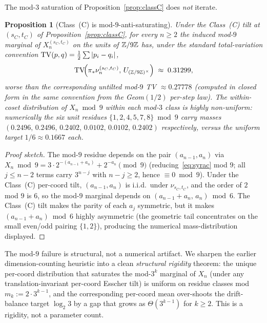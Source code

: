\documentclass[11pt]{amsart}
\newtheorem{proposition}[theorem]{Proposition}
\theoremstyle{definition}
\theoremstyle{remark}
\begin{document}
The mod-$3$ saturation of Proposition~\ref{prop:classC} does \emph{not} iterate.

\begin{proposition}[Class~(C) is mod-$9$-anti-saturating]\label{prop:mod9}
Under the Class~(C) tilt at $(s_C,t_C)$ of Proposition~\ref{prop:classC}, for every $n\ge2$ the
induced mod-$9$ marginal of $X_n^{(s_C,t_C)}$ on the units of $\mathbb{Z}/9\mathbb{Z}$ has, under the standard
total-variation convention $\mathrm{TV}(p,q)=\tfrac12\sum|p_i-q_i|$,
\[
  \mathrm{TV}\!\Big(\pi_*\nu_n^{(s_C,t_C)},\,U_{(\mathbb{Z}/9\mathbb{Z})^\times}\Big)\;\approx\;0.31299,
\]
\emph{worse} than the corresponding untilted mod-$9$ TV $\approx 0.27778$ (computed in closed form
in the same convention from the Geom$(1/2)$ per-step law). The within-coset distribution of
$X_n\bmod 9$ within each mod-$3$ class is highly non-uniform: numerically the six unit residues
$\{1,2,4,5,7,8\}\bmod 9$ carry masses
$(0.2496,\,0.2496,\,0.2402,\,0.0102,\,0.0102,\,0.2402)$ respectively,
versus the uniform target $1/6\approx 0.1667$ each.
\end{proposition}

\begin{proof}[Proof sketch]
The mod-$9$ residue depends on the pair $(a_{n-1},a_n)$ via $X_n\bmod 9=3\cdot 2^{-(a_{n-1}+a_n)}+
2^{-a_n}\pmod 9$ (reducing~\eqref{eq:syrac} mod $9$; all $j\le n-2$ terms carry $3^{n-j}$ with
$n-j\ge 2$, hence $\equiv 0\bmod 9$). Under the Class~(C) per-coord tilt, $(a_{n-1},a_n)$ is i.i.d.\
under $\nu_{s_C,t_C}$, and the order of $2$ mod $9$ is $6$, so the mod-$9$ marginal depends on
$(a_{n-1}+a_n,\,a_n)\bmod 6$. The Class~(C) tilt makes the parity of each $a_j$ symmetric, but it makes
$(a_{n-1}+a_n)\bmod 6$ highly asymmetric (the geometric tail concentrates on the small even/odd pairing
$\{1,2\}$), producing the numerical mass-distribution displayed.
\end{proof}

The mod-$9$ failure is structural, not a numerical artifact. We sharpen the earlier
dimension-counting heuristic into a clean \emph{structural rigidity} theorem: the unique per-coord
distribution that saturates the mod-$3^k$ marginal of $X_n$ (under any translation-invariant per-coord
Esscher tilt) is uniform on residue classes mod $m_k:=2\cdot 3^{k-1}$, and the corresponding per-coord
mean over-shoots the drift-balance target $\log_2 3$ by a gap that grows as $\Theta(3^{k-1})$ for
$k\ge2$. This is a rigidity, not a parameter count.
\end{document}
